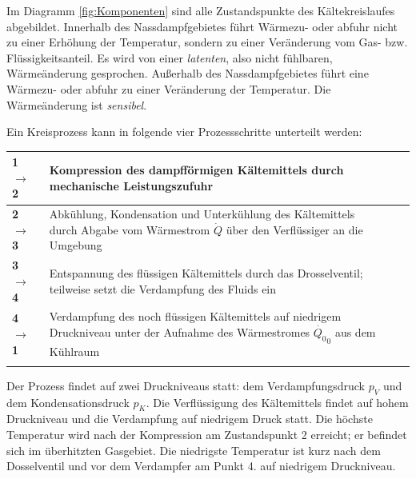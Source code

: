 Im Diagramm \ref{fig:Komponenten} sind alle Zustandspunkte des Kältekreislaufes abgebildet. 
Innerhalb des Nassdampfgebietes führt Wärmezu- oder abfuhr  nicht zu einer Erhöhung der Temperatur, sondern zu einer Veränderung vom Gas- bzw. Flüssigkeitsanteil. Es wird von einer \textit{latenten}, also nicht fühlbaren,  Wärmeänderung gesprochen. 
Außerhalb des Nassdampfgebietes führt eine Wärmezu- oder abfuhr zu einer Veränderung der Temperatur. Die Wärmeänderung ist \textit{sensibel}. 


Ein Kreisprozess kann in folgende vier Prozessschritte unterteilt werden:

\begin{tabular}{p{1.5cm}p{13cm}ll}
\hline
\textbf{1 $\longrightarrow$ 2} & Kompression des dampfförmigen Kältemittels durch mechanische Leistungszufuhr  \\ 
\hline
\textbf{2 $\longrightarrow$ 3} & Abkühlung, Kondensation und Unterkühlung des Kältemittels durch Abgabe vom Wärmestrom $\dot{Q}$ über den Verflüssiger an die Umgebung \\ 
\hline
\textbf{3 $\longrightarrow$ 4} & Entspannung des flüssigen Kältemittels durch das Drosselventil; teilweise setzt die Verdampfung des Fluids ein \\ 
\hline

\textbf{4 $\longrightarrow$ 1} & Verdampfung des noch flüssigen Kältemittels auf niedrigem Druckniveau unter der Aufnahme des Wärmestromes $\dot{Q_0}_0$ aus dem Kühlraum \\ 
\hline
&\\
\end{tabular}
\hspace{1cm}

Der Prozess findet auf zwei Druckniveaus statt: dem Verdampfungsdruck $p_V$ und dem Kondensationsdruck $p_K$. Die Verflüssigung des Kältemittels findet auf hohem Druckniveau und die Verdampfung auf niedrigem Druck statt. Die höchste Temperatur wird nach der Kompression am Zustandspunkt 2 erreicht; er befindet sich im überhitzten Gasgebiet. Die niedrigste Temperatur ist kurz nach dem Dosselventil und vor dem Verdampfer am Punkt 4. auf niedrigem Druckniveau. 

